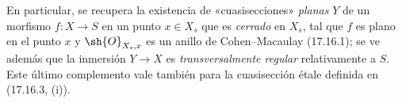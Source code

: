 En particular, se recupera la existencia de «cuasisecciones» \emph{planas} $Y$ de un morfismo $f:X\to S$ en un punto $x\in X_s$ que es \emph{cerrado} en $X_s$, tal que $f$ es plano en el punto $x$ y $\sh{O}_{X_s,x}$ es un anillo de Cohen--Macaulay (17.16.1); se ve además que la inmersión $Y\to X$ es \emph{transversalmente regular} relativamente a $S$. Este último complemento vale también para la cuasisección étale definida en (17.16.3, (i)).
